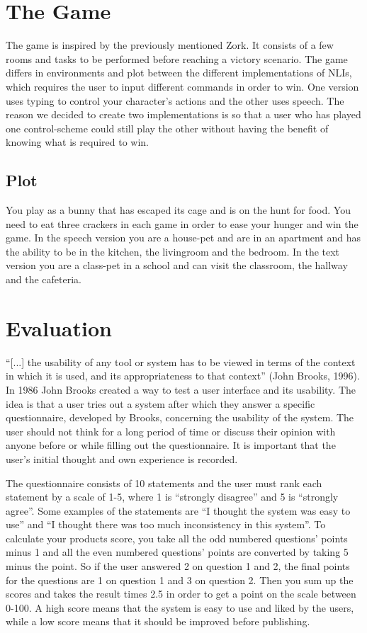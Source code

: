 \section{The Game}
The game is inspired by the previously mentioned Zork. It consists of a few rooms and tasks to be performed before reaching a victory scenario. The game differs in environments and plot between the different implementations of NLIs, which requires the user to input different commands in order to win. One version uses typing to control your character’s actions and the other uses speech. The reason we decided to create two implementations is so that a user who has played one control-scheme could still play the other without having the benefit of knowing what is required to win.

\subsection{Plot}
You play as a bunny that has escaped its cage and is on the hunt for food. You need to eat three crackers in each game in order to ease your hunger and win the game. In the speech version you are a house-pet and are in an apartment and has the ability to be in the kitchen, the livingroom and the bedroom. In the text version you are a class-pet in a school and can visit the classroom, the hallway and the cafeteria.

\section{Evaluation}
“[...] the usability of any tool or system has to be viewed in terms of the context in which it is used, and its appropriateness to that context” (John Brooks, 1996). In 1986 John Brooks created a way to test a user interface and its usability. The idea is that a user tries out a system after which they answer a specific questionnaire, developed by Brooks, concerning the usability of the system. The user should not think for a long period of time or discuss their opinion with anyone before or while filling out the questionnaire. It is important that the user’s initial thought and own experience is recorded.

The questionnaire consists of 10 statements and the user must rank each statement by a scale of 1-5, where 1 is “strongly disagree” and 5 is “strongly agree”. Some examples of the statements are “I thought the system was easy to use” and “I thought there was too much inconsistency in this system”. To calculate your products score, you take all the odd numbered questions’ points minus 1 and all the even numbered questions’ points are converted by taking 5 minus the point. So if the user answered 2 on question 1 and 2, the final points for the questions are 1 on question 1 and 3 on question 2. Then you sum up the scores and takes the result times 2.5 in order to get a point on the scale between 0-100. A high score means that the system is easy to use and liked by the users, while a low score means that it should be improved before publishing.

